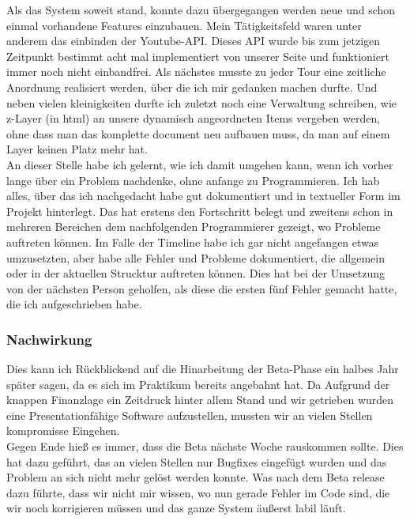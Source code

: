 Als das System soweit stand, konnte dazu übergegangen werden neue und schon einmal vorhandene Features einzubauen. Mein Tätigkeitsfeld waren unter anderem das einbinden der Youtube-API. Dieses API wurde bis zum jetzigen Zeitpunkt bestimmt acht mal implementiert von unserer Seite und funktioniert immer noch nicht einbandfrei. Als nächstes musste zu jeder Tour eine zeitliche Anordnung realisiert werden, über die ich mir gedanken machen durfte. Und neben vielen kleinigkeiten durfte ich zuletzt noch eine Verwaltung schreiben, wie z-Layer (in html) an unsere dynamisch angeordneten Items vergeben werden, ohne dass man das komplette document neu aufbauen muss, da man auf einem Layer keinen Platz mehr hat.\\

An dieser Stelle habe ich gelernt, wie ich damit umgehen kann, wenn ich vorher lange über ein Problem nachdenke, ohne anfange zu Programmieren. Ich hab alles, über das ich nachgedacht habe gut dokumentiert und in textueller Form im Projekt hinterlegt. Das hat erstens den Fortschritt belegt und zweitens schon in mehreren Bereichen dem nachfolgenden Programmierer gezeigt, wo Probleme auftreten können. Im Falle der Timeline habe ich gar nicht angefangen etwas umzusetzten, aber habe alle Fehler und Probleme dokumentiert, die allgemein oder in der aktuellen Strucktur auftreten können. Dies hat bei der Umsetzung von der nächsten Person geholfen, als diese die ersten fünf Fehler gemacht hatte, die ich aufgeschrieben habe.\\

\subsubsection{Nachwirkung}

Dies kann ich Rückblickend auf die Hinarbeitung der Beta-Phase ein halbes Jahr später sagen, da es sich im Praktikum bereits angebahnt hat. Da Aufgrund der knappen Finanzlage ein Zeitdruck hinter allem Stand und wir getrieben wurden eine Presentationfähige Software aufzustellen, mussten wir an vielen Stellen kompromisse Eingehen.\\
Gegen Ende hieß es immer, dass die Beta nächste Woche rauskommen sollte. Dies hat dazu geführt, das an vielen Stellen nur Bugfixes eingefügt wurden und das Problem an sich nicht mehr gelöst werden konnte. Was nach dem Beta release dazu führte, dass wir nicht mir wissen, wo nun gerade Fehler im Code sind, die wir noch korrigieren müssen und das ganze System äußerst labil läuft.\\


